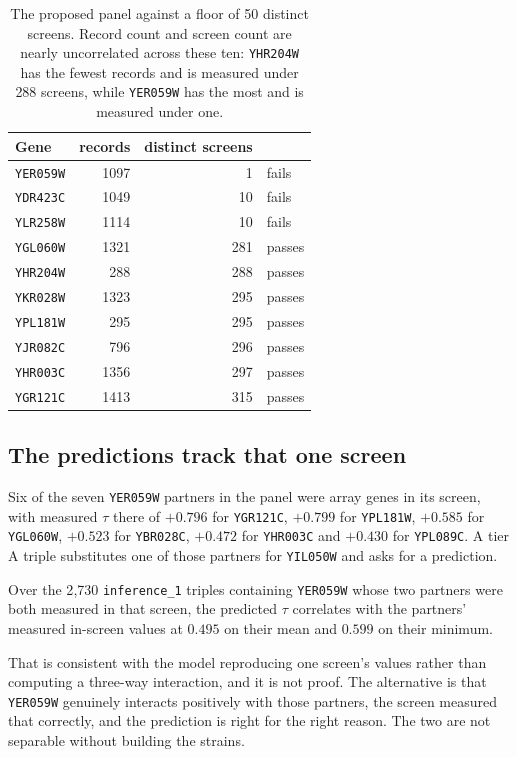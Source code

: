 \begin{table}[H]
\centering
\begin{tabular}{lrrl}
\toprule
Gene & records & distinct screens & \\
\midrule
\texttt{YER059W} & 1097 & 1   & fails \\
\texttt{YDR423C} & 1049 & 10  & fails \\
\texttt{YLR258W} & 1114 & 10  & fails \\
\texttt{YGL060W} & 1321 & 281 & passes \\
\texttt{YHR204W} & 288  & 288 & passes \\
\texttt{YKR028W} & 1323 & 295 & passes \\
\texttt{YPL181W} & 295  & 295 & passes \\
\texttt{YJR082C} & 796  & 296 & passes \\
\texttt{YHR003C} & 1356 & 297 & passes \\
\texttt{YGR121C} & 1413 & 315 & passes \\
\bottomrule
\end{tabular}
\caption{The proposed panel against a floor of 50 distinct screens. Record count
and screen count are nearly uncorrelated across these ten: \texttt{YHR204W} has
the fewest records and is measured under 288 screens, while \texttt{YER059W} has
the most and is measured under one.}
\end{table}

\subsection{The predictions track that one screen}

Six of the seven \texttt{YER059W} partners in the panel were array genes in its
screen, with measured $\tau$ there of $+0.796$ for \texttt{YGR121C}, $+0.799$ for
\texttt{YPL181W}, $+0.585$ for \texttt{YGL060W}, $+0.523$ for \texttt{YBR028C},
$+0.472$ for \texttt{YHR003C} and $+0.430$ for \texttt{YPL089C}. A tier A triple
substitutes one of those partners for \texttt{YIL050W} and asks for a prediction.

Over the 2{,}730 \texttt{inference\_1} triples containing \texttt{YER059W} whose
two partners were both measured in that screen, the predicted $\tau$ correlates
with the partners' measured in-screen values at $0.495$ on their mean and
$0.599$ on their minimum.

That is consistent with the model reproducing one screen's values rather than
computing a three-way interaction, and it is not proof. The alternative is that
\texttt{YER059W} genuinely interacts positively with those partners, the screen
measured that correctly, and the prediction is right for the right reason. The
two are not separable without building the strains.

